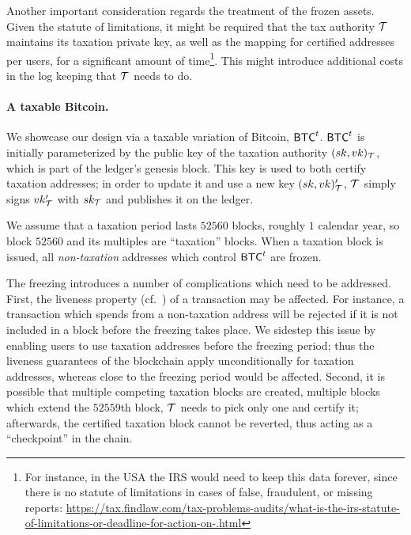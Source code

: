 Another important consideration regards the treatment of the frozen assets.
Given the statute of limitations, it might be required that the tax authority
$\mathcal{T}$ maintains its taxation private key, as well as the mapping for
certified addresses per users, for a significant amount of time\footnote{For
instance, in the USA the IRS would need to keep this data forever, since there
is no statute of limitations in cases of false, fraudulent, or missing reports:
\url{https://tax.findlaw.com/tax-problems-audits/what-is-the-irs-statute-of-limitations-or-deadline-for-action-on-.html}}.
This might introduce additional costs in the log keeping that $\mathcal{T}$ needs
to do.

\paragraph{A taxable Bitcoin.}

We showcase our design via a taxable variation of Bitcoin, $\mathsf{BTC}^{t}$. $\mathsf{BTC}^{t}$
is initially parameterized by the public key of the taxation authority
$(sk, vk)_\mathcal{T}$, which is part of the ledger's genesis block. This key is
used to both certify taxation addresses; in order to update it and use a new
key $(sk, vk)_\mathcal{T}'$, $\mathcal{T}$ simply signs $vk_\mathcal{T}'$ with
$sk_\mathcal{T}$ and publishes it on the ledger.

We assume that a taxation period lasts $52560$ blocks, \ie roughly $1$ calendar
year, so block $52560$ and its multiples are ``taxation'' blocks.  When a
taxation block is issued, all \emph{non-taxation} addresses which control
$\mathsf{BTC}^{t}$ are frozen.

The freezing introduces a number of complications which need to be addressed.
First, the liveness property (cf.~\cite{EC:GarKiaLeo15}) of a transaction may
be affected. For instance, a transaction which spends from a non-taxation
address will be rejected if it is not included in a block before the freezing
takes place. We sidestep this issue by enabling users to use taxation addresses
before the freezing period; thus the liveness guarantees of the blockchain
apply unconditionally for taxation addresses, whereas close to the freezing
period would be affected. Second, it is possible that multiple competing
taxation blocks are created, \eg multiple blocks which extend the $52559$th
block, $\mathcal{T}$ needs to pick only one and certify it; afterwards, the
certified taxation block cannot be reverted, thus acting as a ``checkpoint'' in
the chain.

